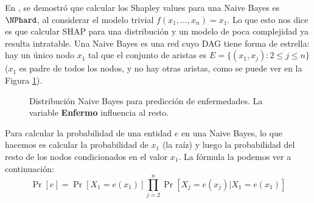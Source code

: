 

En \cite{van2022tractability}, se demostró que calcular los Shapley values para una Naive Bayes es \(\NPhard\), al considerar el modelo trivial \(f(x_1,\ldots,x_n) = x_1\). Lo que esto nos dice es que calcular SHAP para una distribución y un modelo de poca complejidad ya resulta intratable. Una Naive Bayes es una red cuyo DAG tiene forma de estrella:  hay un único nodo \(x_1\) tal que el conjunto de aristas es \(E = \{(x_1, x_j) : 2 \leq j \leq n\}\) (\(x_1\) es padre de todos los nodos, y no hay otras aristas, como se puede ver en la Figura \ref{fig:naiveBayesExample}).  

\begin{figure}[ht]
	\centering
	\caption{Distribución Naive Bayes para predicción de enfermedades. La variable \textbf{Enfermo} influencia al resto.}
	\label{fig:naiveBayesExample}
\end{figure}


Para calcular la probabilidad de una entidad \(e\) en una Naive Bayes, lo que hacemos es calcular la probabilidad de $x_1$ (la raíz) y luego la probabilidad del resto de los nodos condicionados en el valor $x_1$. La fórmula la podemos ver a continuación:
\[
\Pr[e] = \Pr[X_1 = e(x_1)] \prod_{j=2}^n \Pr[X_j = e(x_j) | X_1 = e(x_1)]
\]

